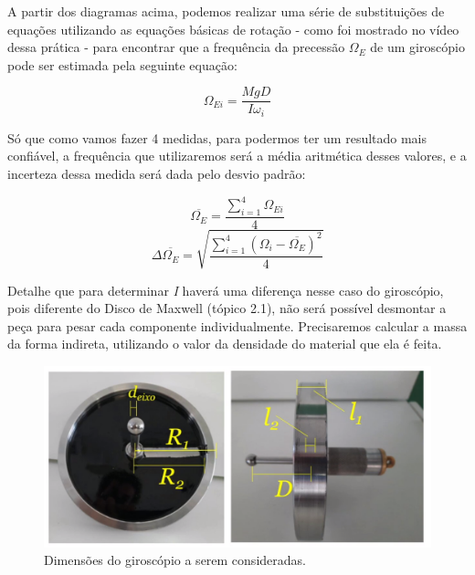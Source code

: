 A partir dos diagramas acima, podemos realizar uma série de substituições de equações utilizando as equações básicas de rotação - como foi mostrado no vídeo dessa prática - para encontrar que a frequência da precessão $\Omega _E$ de um giroscópio pode ser estimada pela seguinte equação:

\[ \Omega _{Ei} = \frac{MgD}{I \omega _i} \]

Só que como vamos fazer 4 medidas, para podermos ter um resultado mais confiável, a frequência que utilizaremos será a média aritmética desses valores, e a incerteza dessa medida será dada pelo desvio padrão:

\[ \overline{\Omega _E} = \frac{\sum_{i=1}^{4} \Omega _{Ei}}{4}\]
\[ \Delta \overline{\Omega _E} = \sqrt{\frac{\sum_{i=1}^{4} (\Omega _i - \overline{\Omega _E})^2}{4}}\]




Detalhe que para determinar \textit{I} haverá uma diferença nesse caso do giroscópio, pois diferente do Disco de Maxwell (tópico 2.1), não será possível desmontar a peça para pesar cada componente individualmente. Precisaremos calcular a massa da forma indireta, utilizando o valor da densidade do material que ela é feita.\\

\begin{figure}[H]
  \centering
  \includegraphics[scale=0.5]{images/medidas-giroscopio.png}
  \caption{Dimensões do giroscópio a serem consideradas.}
\end{figure}

